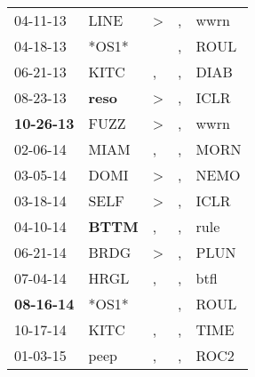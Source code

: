 \begin{supertabular}{p{0.07\textwidth}p{0.06\textwidth}p{0.02\textwidth}p{0.02\textwidth}p{0.06\textwidth}}
          04-11-13\textsuperscript{} &           LINE\textsuperscript{} &     \textgreater &                , &           wwrn\textsuperscript{} \\
          04-18-13\textsuperscript{} &                            *OS1* &                  &                , &           ROUL\textsuperscript{} \\
          06-21-13\textsuperscript{} &           KITC\textsuperscript{} &                , &                , &           DIAB\textsuperscript{} \\
          08-23-13\textsuperscript{} &  \textbf{reso\textsuperscript{}} &     \textgreater &                , &           ICLR\textsuperscript{} \\
 \textbf{10-26-13\textsuperscript{}} &           FUZZ\textsuperscript{} &     \textgreater &                , &           wwrn\textsuperscript{} \\
          02-06-14\textsuperscript{} &           MIAM\textsuperscript{} &                , &                , &           MORN\textsuperscript{} \\
          03-05-14\textsuperscript{} &           DOMI\textsuperscript{} &     \textgreater &                , &           NEMO\textsuperscript{} \\
          03-18-14\textsuperscript{} &           SELF\textsuperscript{} &     \textgreater &                , &           ICLR\textsuperscript{} \\
          04-10-14\textsuperscript{} &  \textbf{BTTM\textsuperscript{}} &                , &                , &           rule\textsuperscript{} \\
          06-21-14\textsuperscript{} &           BRDG\textsuperscript{} &     \textgreater &                , &           PLUN\textsuperscript{} \\
          07-04-14\textsuperscript{} &           HRGL\textsuperscript{} &                , &                , &           btfl\textsuperscript{} \\
 \textbf{08-16-14\textsuperscript{}} &                            *OS1* &                  &                , &           ROUL\textsuperscript{} \\
          10-17-14\textsuperscript{} &           KITC\textsuperscript{} &                , &                , &           TIME\textsuperscript{} \\
          01-03-15\textsuperscript{} &           peep\textsuperscript{} &                , &                , &           ROC2\textsuperscript{} \\

\end{supertabular}
